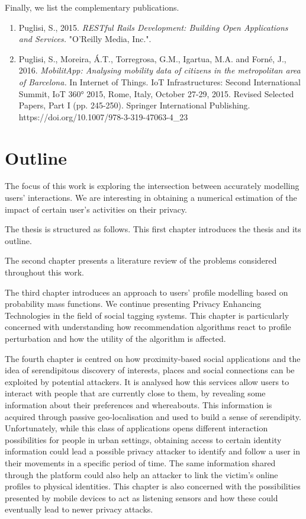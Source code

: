 Finally, we list the complementary publications.

\begin{enumerate}
    \item Puglisi, S., 2015. \emph{RESTful Rails Development: Building Open Applications and Services.} "O'Reilly Media, Inc.". 
    
    \item Puglisi, S., Moreira, \'A.T., Torregrosa, G.M., Igartua, M.A. and Forn\'e, J., 2016. \emph{MobilitApp: Analysing mobility data of citizens in the metropolitan area of Barcelona.} In Internet of Things. IoT Infrastructures: Second International Summit, IoT 360° 2015, Rome, Italy, October 27-29, 2015. Revised Selected Papers, Part I (pp. 245-250). Springer International Publishing. https://doi.org/10.1007/978-3-319-47063-4\_23
\end{enumerate}

\section{Outline}

The focus of this work is exploring the intersection between accurately modelling users' interactions. We are interesting in obtaining a numerical estimation of the impact of certain user’s activities on their privacy. 

The thesis is structured as follows. This first chapter introduces the thesis and its outline.
 
The second chapter presents a literature review of the problems considered throughout this work.

The third chapter introduces an approach to users' profile modelling based on probability mass functions. We continue presenting Privacy Enhancing Technologies in the field of social tagging systems. This chapter is particularly concerned with understanding how recommendation algorithms react to profile perturbation and how the utility of the algorithm is affected.

The fourth chapter is centred on how proximity-based social applications and the idea of serendipitous discovery of interests, places and social connections can be exploited by potential attackers. It is analysed how this services allow users to interact with people that are currently close to them, by revealing some information about their preferences and whereabouts. This information is acquired through passive geo-localisation and used to build a sense of serendipity. Unfortunately, while this class of applications opens different interaction possibilities for people in urban settings, obtaining access to certain identity information could lead a possible privacy attacker to identify and follow a user in their movements in a specific period of time. The same information shared through the platform could also help an attacker to link the victim’s online profiles to physical identities. This chapter is also concerned with the possibilities presented by mobile devices to act as listening sensors and how these could eventually lead to newer privacy attacks.

